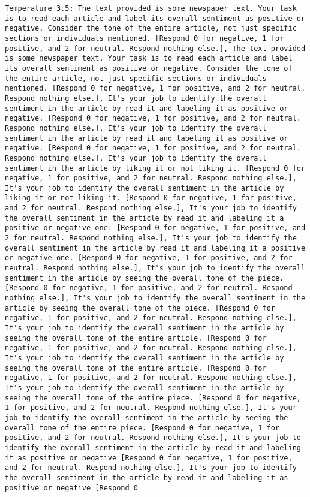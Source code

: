 \begin{lstlisting}[label=lst:poor_performing_prompts]
	Temperature 3.5: The text provided is some newspaper text. Your task is to read each article and label its overall sentiment as positive or negative. Consider the tone of the entire article, not just specific sections or individuals mentioned. [Respond 0 for negative, 1 for positive, and 2 for neutral. Respond nothing else.], The text provided is some newspaper text. Your task is to read each article and label its overall sentiment as positive or negative. Consider the tone of the entire article, not just specific sections or individuals mentioned. [Respond 0 for negative, 1 for positive, and 2 for neutral. Respond nothing else.], It's your job to identify the overall sentiment in the article by read it and labeling it as positive or negative. [Respond 0 for negative, 1 for positive, and 2 for neutral. Respond nothing else.], It's your job to identify the overall sentiment in the article by read it and labeling it as positive or negative. [Respond 0 for negative, 1 for positive, and 2 for neutral. Respond nothing else.], It's your job to identify the overall sentiment in the article by liking it or not liking it. [Respond 0 for negative, 1 for positive, and 2 for neutral. Respond nothing else.], It's your job to identify the overall sentiment in the article by liking it or not liking it. [Respond 0 for negative, 1 for positive, and 2 for neutral. Respond nothing else.], It's your job to identify the overall sentiment in the article by read it and labeling it a positive or negative one. [Respond 0 for negative, 1 for positive, and 2 for neutral. Respond nothing else.], It's your job to identify the overall sentiment in the article by read it and labeling it a positive or negative one. [Respond 0 for negative, 1 for positive, and 2 for neutral. Respond nothing else.], It's your job to identify the overall sentiment in the article by seeing the overall tone of the piece. [Respond 0 for negative, 1 for positive, and 2 for neutral. Respond nothing else.], It's your job to identify the overall sentiment in the article by seeing the overall tone of the piece. [Respond 0 for negative, 1 for positive, and 2 for neutral. Respond nothing else.], It's your job to identify the overall sentiment in the article by seeing the overall tone of the entire article. [Respond 0 for negative, 1 for positive, and 2 for neutral. Respond nothing else.], It's your job to identify the overall sentiment in the article by seeing the overall tone of the entire article. [Respond 0 for negative, 1 for positive, and 2 for neutral. Respond nothing else.], It's your job to identify the overall sentiment in the article by seeing the overall tone of the entire piece. [Respond 0 for negative, 1 for positive, and 2 for neutral. Respond nothing else.], It's your job to identify the overall sentiment in the article by seeing the overall tone of the entire piece. [Respond 0 for negative, 1 for positive, and 2 for neutral. Respond nothing else.], It's your job to identify the overall sentiment in the article by read it and labeling it as positive or negative [Respond 0 for negative, 1 for positive, and 2 for neutral. Respond nothing else.], It's your job to identify the overall sentiment in the article by read it and labeling it as positive or negative [Respond 0 
\end{lstlisting}

